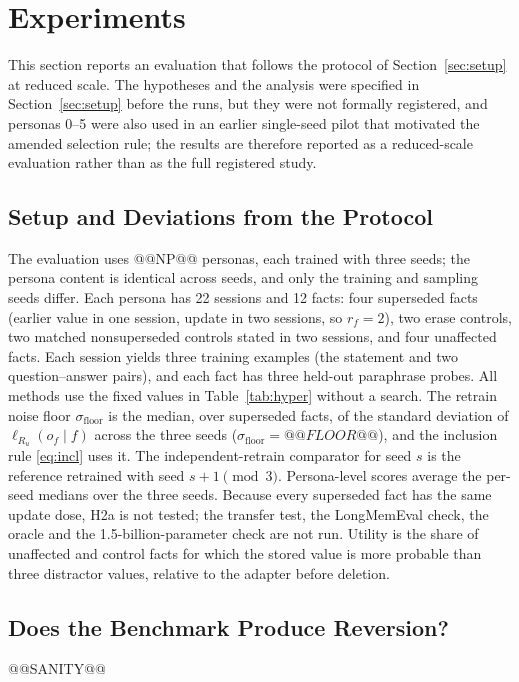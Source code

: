 \section{Experiments}
\label{sec:results}
This section reports an evaluation that follows the protocol of Section~\ref{sec:setup} at reduced scale. The hypotheses and the analysis were specified in Section~\ref{sec:setup} before the runs, but they were not formally registered, and personas 0--5 were also used in an earlier single-seed pilot that motivated the amended selection rule; the results are therefore reported as a reduced-scale evaluation rather than as the full registered study.

\subsection{Setup and Deviations from the Protocol}
\label{sec:pilot-setup}
The evaluation uses @@NP@@ personas, each trained with three seeds; the persona content is identical across seeds, and only the training and sampling seeds differ. Each persona has 22 sessions and 12 facts: four superseded facts (earlier value in one session, update in two sessions, so $r_f = 2$), two erase controls, two matched nonsuperseded controls stated in two sessions, and four unaffected facts. Each session yields three training examples (the statement and two question--answer pairs), and each fact has three held-out paraphrase probes. All methods use the fixed values in Table~\ref{tab:hyper} without a search. The retrain noise floor $\sigma_{\mathrm{floor}}$ is the median, over superseded facts, of the standard deviation of $\ell_{R_u}(o_f \mid f)$ across the three seeds ($\sigma_{\mathrm{floor}} = @@FLOOR@@$), and the inclusion rule \eqref{eq:incl} uses it. The independent-retrain comparator for seed $s$ is the reference retrained with seed $s+1 \pmod 3$. Persona-level scores average the per-seed medians over the three seeds. Because every superseded fact has the same update dose, H2a is not tested; the transfer test, the LongMemEval check, the oracle and the 1.5-billion-parameter check are not run. Utility is the share of unaffected and control facts for which the stored value is more probable than three distractor values, relative to the adapter before deletion.

\subsection{Does the Benchmark Produce Reversion?}
\label{sec:pilot-sanity}
@@SANITY@@

